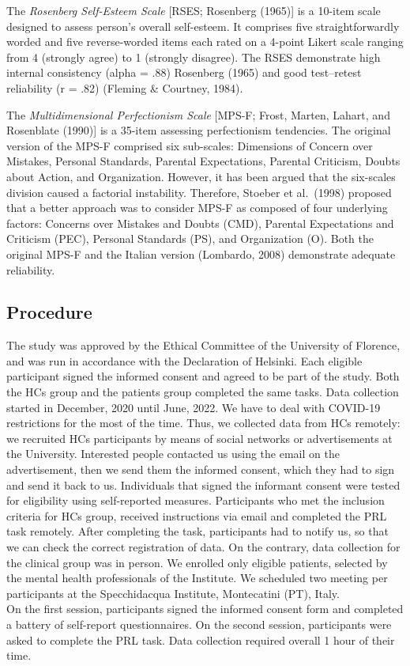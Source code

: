\documentclass[
  man,floatsintext]{apa6}
\begin{document}
The \emph{Rosenberg Self-Esteem Scale} {[}RSES; Rosenberg (1965){]} is a 10-item scale designed to assess person's overall self-esteem. It comprises five straightforwardly worded and five reverse-worded items each rated on a 4-point Likert scale ranging from 4 (strongly agree) to 1 (strongly disagree). The RSES demonstrate high internal consistency (alpha = .88) Rosenberg (1965) and good test--retest reliability (r = .82) (Fleming \& Courtney, 1984).

The \emph{Multidimensional Perfectionism Scale} {[}MPS-F; Frost, Marten, Lahart, and Rosenblate (1990){]} is a 35-item assessing perfectionism tendencies. The original version of the MPS-F comprised six sub-scales: Dimensions of Concern over Mistakes, Personal Standards, Parental Expectations, Parental Criticism, Doubts about Action, and Organization. However, it has been argued that the six-scales division caused a factorial instability. Therefore, Stoeber et al.~(1998) proposed that a better approach was to consider MPS-F as composed of four underlying factors: Concerns over Mistakes and Doubts (CMD), Parental Expectations and Criticism (PEC), Personal Standards (PS), and Organization (O). Both the original MPS-F and the Italian version (Lombardo, 2008) demonstrate adequate reliability.

\hypertarget{procedure}{%
\subsection{Procedure}\label{procedure}}

The study was approved by the Ethical Committee of the University of Florence, and was run in accordance with the Declaration of Helsinki.
Each eligible participant signed the informed consent and agreed to be part of the study.
Both the HCs group and the patients group completed the same tasks.
Data collection started in December, 2020 until June, 2022. We have to deal with COVID-19 restrictions for the most of the time. Thus, we collected data from HCs remotely: we recruited HCs participants by means of social networks or advertisements at the University. Interested people contacted us using the email on the advertisement, then we send them the informed consent, which they had to sign and send it back to us. Individuals that signed the informant consent were tested for eligibility using self-reported measures. Participants who met the inclusion criteria for HCs group, received instructions via email and completed the PRL task remotely. After completing the task, participants had to notify us, so that we can check the correct registration of data.
On the contrary, data collection for the clinical group was in person. We enrolled only eligible patients, selected by the mental health professionals of the Institute. We scheduled two meeting per participants at the Specchidacqua Institute, Montecatini (PT), Italy.\\
On the first session, participants signed the informed consent form and completed a battery of self-report questionnaires. On the second session, participants were asked to complete the PRL task. Data collection required overall 1 hour of their time.
\end{document}
